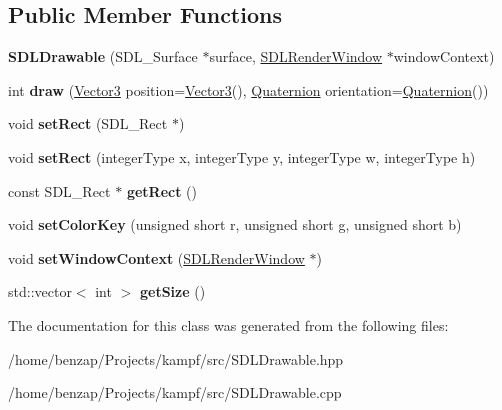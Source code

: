 \subsection*{Public Member Functions}
\begin{DoxyCompactItemize}
\item 
\hypertarget{classSDLDrawable_aab268d8ff079729286932f6d151f62f6}{{\bfseries S\-D\-L\-Drawable} (S\-D\-L\-\_\-\-Surface $\ast$surface, \hyperlink{classSDLRenderWindow}{S\-D\-L\-Render\-Window} $\ast$window\-Context)}\label{classSDLDrawable_aab268d8ff079729286932f6d151f62f6}

\item 
\hypertarget{classSDLDrawable_a42f63fb20ef98824c5a6e686b60e7657}{int {\bfseries draw} (\hyperlink{classVector3}{Vector3} position=\hyperlink{classVector3}{Vector3}(), \hyperlink{classQuaternion}{Quaternion} orientation=\hyperlink{classQuaternion}{Quaternion}())}\label{classSDLDrawable_a42f63fb20ef98824c5a6e686b60e7657}

\item 
\hypertarget{classSDLDrawable_abeca9a1705f3e3e794afe7899bf54dcc}{void {\bfseries set\-Rect} (S\-D\-L\-\_\-\-Rect $\ast$)}\label{classSDLDrawable_abeca9a1705f3e3e794afe7899bf54dcc}

\item 
\hypertarget{classSDLDrawable_af199334073048b59d120bee78e4e7fa8}{void {\bfseries set\-Rect} (integer\-Type x, integer\-Type y, integer\-Type w, integer\-Type h)}\label{classSDLDrawable_af199334073048b59d120bee78e4e7fa8}

\item 
\hypertarget{classSDLDrawable_a4e14f226fa931ecd4e420eafa7a92b7f}{const S\-D\-L\-\_\-\-Rect $\ast$ {\bfseries get\-Rect} ()}\label{classSDLDrawable_a4e14f226fa931ecd4e420eafa7a92b7f}

\item 
\hypertarget{classSDLDrawable_a2d98ddac75bb6447ea625211fb1e7d30}{void {\bfseries set\-Color\-Key} (unsigned short r, unsigned short g, unsigned short b)}\label{classSDLDrawable_a2d98ddac75bb6447ea625211fb1e7d30}

\item 
\hypertarget{classSDLDrawable_a7c7eb15bfdc89f21e1a75acdc596bce7}{void {\bfseries set\-Window\-Context} (\hyperlink{classSDLRenderWindow}{S\-D\-L\-Render\-Window} $\ast$)}\label{classSDLDrawable_a7c7eb15bfdc89f21e1a75acdc596bce7}

\item 
\hypertarget{classSDLDrawable_a91b222f7b38e1d14c2681dd713190670}{std\-::vector$<$ int $>$ {\bfseries get\-Size} ()}\label{classSDLDrawable_a91b222f7b38e1d14c2681dd713190670}

\end{DoxyCompactItemize}


The documentation for this class was generated from the following files\-:\begin{DoxyCompactItemize}
\item 
/home/benzap/\-Projects/kampf/src/S\-D\-L\-Drawable.\-hpp\item 
/home/benzap/\-Projects/kampf/src/S\-D\-L\-Drawable.\-cpp\end{DoxyCompactItemize}
